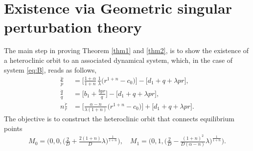 \documentclass[graybox]{svmult}
\def\dpp{\dot{p}}
\def\dqq{\dot{q}}
\def\drr{\dot{r}}
\begin{document}
\section{Existence via Geometric singular perturbation theory} \label{sec:idea}

The main step in proving Theorem \ref{thm1} and \ref{thm2}, is to show the existence of a heteroclinic orbit to an associated dynamical system, which, in the case of  system  \eqref{eq:B}, reads as follows,
\begin{equation} \label{eq:pqrsys}\tag{P}
\begin{aligned}
 \frac{\dpp}{p}&=\Big[\frac{1+\alpha}{1+n}\,\frac{1}{\lambda }\Big(r^{1+n}-c_0\Big)\Big] -\Big[d_1 + q + \lambda pr\Big],\\
 \frac{\dqq}{q}&=\Big[b_1 +\frac{bpr}{q}\Big] -\Big[d_1 + q + \lambda pr\Big],\\
 n\frac{\drr}{r}&=\Big[\frac{\alpha-n}{\lambda(1+n)}\Big(r^{1+n}-c_0\Big)\Big]+\Big[d_1 + q + \lambda pr\Big].
\end{aligned}
\end{equation}
The objective is to construct the heteroclinic orbit that connects equilibrium points
\begin{align*}
 M_0=\Big(0,0,\big(\frac{2}{D} + \frac{2(1+n)}{D} \lambda\big)^{\frac{1}{1+n}}\Big), \quad M_1=\Big(0,1,\big(\frac{2}{D} -\frac{(1+n)^2}{D(\alpha-n)} \lambda\big)^{\frac{1}{1+n}}\Big).
\end{align*}
\end{document}
